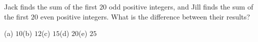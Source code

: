Jack finds the sum of the first $20$ odd positive integers, and Jill finds the sum of the first $20$ even positive integers. What is the difference between their results?

(a) $10$\quad (b) $12$\quad (c) $15$\quad (d) $20$\quad (e) $25$
